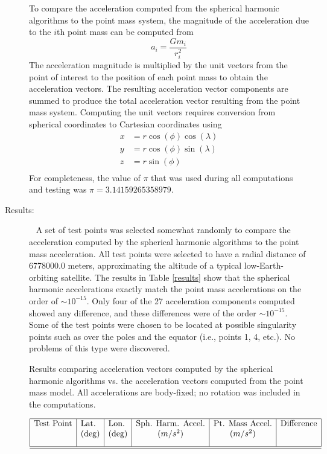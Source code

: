\begin{description}
To compare the acceleration computed from the spherical harmonic algorithms to
the point mass system, the magnitude of the acceleration due to the $i$th point
mass can be computed from 
\begin{equation}\label{acceleration}
a_i=\frac{Gm_i}{r_i^2}
\end{equation}
The acceleration magnitude is multiplied by the unit vectors from the point of
interest to the position of each point mass to obtain the acceleration vectors.
The resulting acceleration vector components are summed to produce the total
acceleration vector resulting from the point mass system. Computing the unit
vectors requires conversion from spherical coordinates to Cartesian coordinates
using
\begin{equation}\label{sphere2cart}
\begin{aligned}
x &= r\cos(\phi)\cos(\lambda)\\
y &= r\cos(\phi)\sin(\lambda)\\
z &= r\sin(\phi)\\
\end{aligned}
\end{equation}
For completeness, the value of $\pi$ that was used during all computations
and testing was $\pi = 3.14159265358979$.

\item[Results:] \ \newline
A set of test points was selected somewhat randomly to compare the acceleration
computed by the spherical harmonic algorithms to the point mass acceleration.
All test points were selected to have a radial distance of 6778000.0 meters,
approximating the altitude of a typical low-Earth-orbiting satellite. The
results in Table \ref{results} show that the spherical harmonic accelerations
exactly match the point mass accelerations on the order of $\sim 10^{-15}$.
Only four of the 27 acceleration components computed showed any difference,
and these differences were of the order $\sim10^{-15}$. Some of the test points
were chosen to be located at possible singularity points such as over the poles
and the equator (i.e., points 1, 4, etc.). No problems of this type were
discovered.

\begin{table}\caption{Results comparing acceleration vectors computed by the
spherical harmonic algorithms vs. the acceleration vectors computed from the
point mass model. All accelerations are body-fixed; no rotation was included
in the computations.} \label{results}
\smallskip
\[ \begin{array}{| c | l | l | c | c | c |}\hline
\mbox{Test Point} & \mbox{Lat.} & \mbox{Lon.} & \mbox{Sph. Harm. Accel.} & \mbox{Pt. Mass Accel.} 
& \mbox{Difference}\\
\mbox{ } & \mbox{(deg)} & \mbox{(deg)} & \mbox{$(m/s^2)$} &
\mbox{($m/s^2)$} & \mbox{ }
\\*[0.3cm]\hline \hline


\end{array}\]
\end{table}
\end{description}
